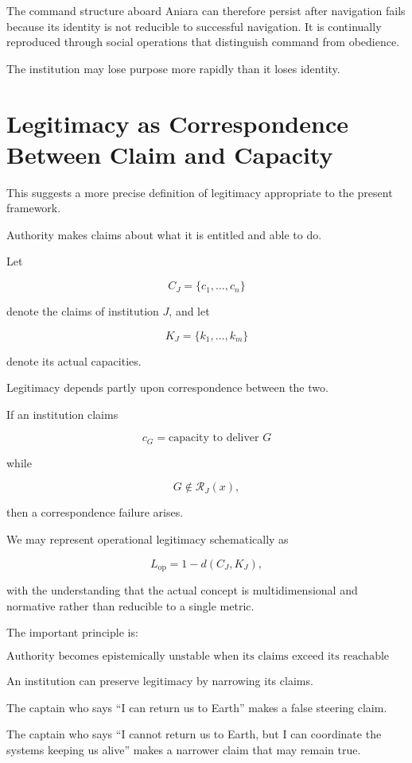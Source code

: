 \documentclass[11pt,oneside]{book}
\theoremstyle{definition}
\theoremstyle{remark}
\newcommand{\R}{\mathcal{R}}
\begin{document}
The command structure aboard Aniara can therefore persist after navigation fails because its identity is not reducible to successful navigation. It is continually reproduced through social operations that distinguish command from obedience.

The institution may lose purpose more rapidly than it loses identity.

\section{Legitimacy as Correspondence Between Claim and Capacity}

This suggests a more precise definition of legitimacy appropriate to the present framework.

Authority makes claims about what it is entitled and able to do.

Let

\[
C_J
=
\{c_1,\ldots,c_n\}
\]

denote the claims of institution \(J\), and let

\[
K_J
=
\{k_1,\ldots,k_m\}
\]

denote its actual capacities.

Legitimacy depends partly upon correspondence between the two.

If an institution claims

\[
c_G=\text{capacity to deliver }G
\]

while

\[
G\notin\R_J(x),
\]

then a correspondence failure arises.

We may represent operational legitimacy schematically as

\[
L_{\mathrm{op}}
=
1-d(C_J,K_J),
\]

with the understanding that the actual concept is multidimensional and normative rather than reducible to a single metric.

The important principle is:

\[
\boxed{
\text{Authority becomes epistemically unstable when its claims exceed its reachable capacities.}
}
\]

An institution can preserve legitimacy by narrowing its claims.

The captain who says ``I can return us to Earth'' makes a false steering claim.

The captain who says ``I cannot return us to Earth, but I can coordinate the systems keeping us alive'' makes a narrower claim that may remain true.
\end{document}
